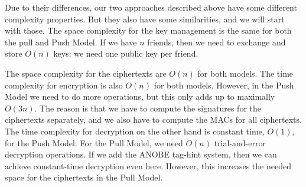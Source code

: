 Due to their differences, our two approaches described above have some 
different complexity properties.
But they also have some similarities, and we will start with those.
The space complexity for the key management is the same for both the pull and 
Push Model.
If we have \(n\) friends, then we need to exchange and store \(O(n)\) keys:
we need one public key per friend.

%
%
%
%
%
%
%
%

The space complexity for the ciphertexts are \(O(n)\) for both models.
The time complexity for encryption is also \(O(n)\) for both models.
However, in the Push Model we need to do more operations, but this only adds up 
to maximally \(O(3n)\).
The reason is that we have to compute the signatures for the ciphertexts 
separately, and we also have to compute the \acp{MAC} for all ciphertexts.
The time complexity for decryption on the other hand is constant time, 
\(O(1)\), for the Push Model.
For the Pull Model, we need \(O(n)\) trial-and-error decryption operations.
If we add the \ac{ANOBE} tag-hint system, then we can achieve constant-time 
decryption even here.
However, this increases the needed space for the ciphertexts in the Pull Model.

%
%
%
%

